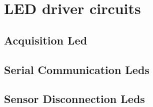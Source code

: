 \section{LED driver circuits}\label{sec:led-driver-circuit}

\subsection{Acquisition Led}\label{ssec:acquisition-led}

\subsection{Serial Communication Leds}\label{ssec:serial-communication-leds}

\subsection{Sensor Disconnection Leds}\label{ssec:sensor-disconnection-leds}